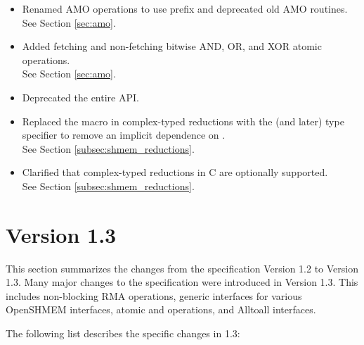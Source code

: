 \begin{itemize}
%
\item Renamed AMO operations to use  prefix and
      deprecated old AMO routines.
\\ See Section \ref{sec:amo}.
%
\item Added fetching and non-fetching bitwise AND, OR, and XOR atomic
      operations.
\\ See Section \ref{sec:amo}.
%
\item Deprecated the entire \Fortran API.
%
\item Replaced the  macro in complex-typed reductions with the
      \Cstd[99] (and later) type specifier  to remove an
      implicit dependence on .
\\ See Section \ref{subsec:shmem_reductions}.
%
\item Clarified that complex-typed reductions in C are optionally supported.
\\ See Section \ref{subsec:shmem_reductions}.
%
\end{itemize}

\section{Version 1.3}
This section summarizes the changes from the \openshmem specification Version
1.2 to Version 1.3. Many major changes to the specification were introduced in Version 1.3. This includes non-blocking RMA operations, 
generic interfaces for various OpenSHMEM interfaces, atomic  and  operations,  and Alltoall interfaces. 


The following list describes the specific changes in 1.3:

